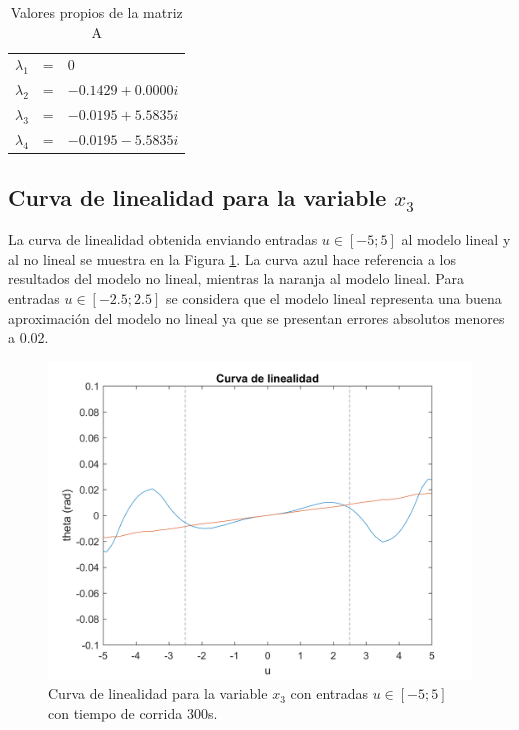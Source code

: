 \documentclass[journal]{IEEEtran}
\begin{document}
\begin{table}[!h]
\centering
\label{valores propios}
\caption{Valores propios de la matriz A}
\begin{tabular}{ccl}
$\lambda_1$ & = & $0$\\
$\lambda_2$ & = & $-0.1429 + 0.0000i$\\
$\lambda_3$ & = & $-0.0195 + 5.5835i$\\
$\lambda_4$ & = & $-0.0195 - 5.5835i$\\
\end{tabular}
\end{table}

\subsection{Curva de linealidad para la variable $x_3$}
La curva de linealidad obtenida enviando entradas $u \in [-5;5]$ al modelo lineal y al no lineal se muestra en la Figura \ref{fig:curve}. La curva azul hace referencia a los resultados del modelo no lineal, mientras la naranja al modelo lineal. Para entradas $u \in [-2.5; 2.5]$ se considera que el modelo lineal representa una buena aproximación del modelo no lineal ya que se presentan errores absolutos menores a 0.02.\\

\begin{figure}[!h]
\caption{Curva de linealidad para la variable $x_3$ con entradas $u \in [-5;5]$ con tiempo de corrida 300s.\label{fig:curve}}
  \centering
\includegraphics[scale=0.2]{curva_lin.png}
\end{figure}
       
\end{document}
